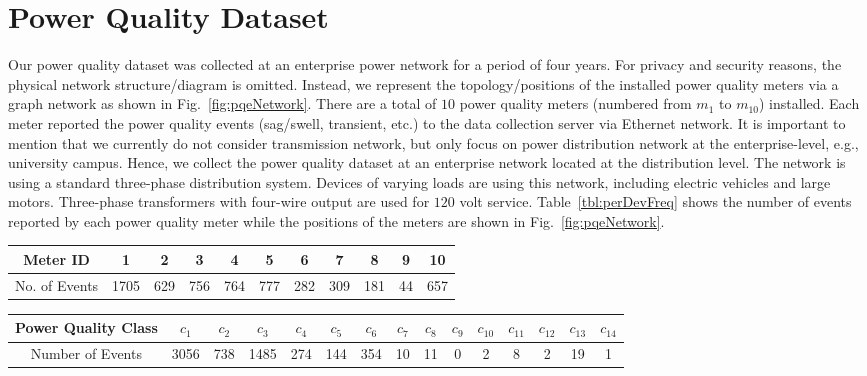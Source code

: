 \section{Power Quality Dataset}
Our power quality dataset was collected at an enterprise power network for a period of four years. For privacy and security reasons, the physical network structure/diagram is omitted. Instead, we represent the topology/positions of the installed power quality meters via a graph network as shown in Fig.~\ref{fig:pqeNetwork}. There are a total of $10$ power quality meters (numbered from $m_1$ to $m_{10}$) installed. Each meter reported the power quality events (sag/swell, transient, etc.) to the data collection server via Ethernet network. It is important to mention that we currently do not consider transmission network, but only focus on power distribution network at the enterprise-level, e.g., university campus. Hence, we collect the power quality dataset at an enterprise network located at the distribution level. The network is using a standard three-phase distribution system. Devices of varying loads are using this network, including electric vehicles and large motors. Three-phase transformers with four-wire output are used for $120$ volt service. Table~\ref{tbl:perDevFreq} shows the number of events reported by each power quality meter while the positions of the meters are shown in Fig.~\ref{fig:pqeNetwork}.

\begin{table*}[!t]
\caption{Frequency table showing the number of events generated/reported by each power quality meter.}
\centering 
\renewcommand{\tabcolsep}{0.15cm}
\begin{tabular}{|c|c|c|c|c|c|c|c|c|c|c|}
\hline Meter ID & 1 & 2 & 3 & 4 & 5 & 6 & 7 & 8 & 9 & 10\tabularnewline
\hline No. of Events & 1705 & 629 & 756 & 764 & 777 & 282 & 309 & 181 & 44 & 657\tabularnewline
\hline 
\end{tabular}
\label{tbl:perDevFreq}
\end{table*}

\begin{table*}[!t]
\caption{Frequency table showing the number of events classified as IEEE power quality class ($c_i$).}
\centering 
\renewcommand{\tabcolsep}{0.12cm}
\begin{tabular}{|c|c|c|c|c|c|c|c|c|c|c|c|c|c|c|}
\hline Power Quality Class & $c_1$ & $c_2$ & $c_3$ & $c_4$ & $c_5$ & $c_6$ & $c_7$ & $c_8$ & $c_9$ & $c_{10}$ & $c_{11}$ & $c_{12}$ & $c_{13}$ & $c_{14}$\tabularnewline
\hline Number of Events & 3056 & 738 & 1485 & 274 & 144 & 354 & 10 & 11 & 0 & 2 & 8 & 2 & 19 & 1\tabularnewline
\hline 
\end{tabular}
\label{tbl:perClassFreq}
\end{table*}

